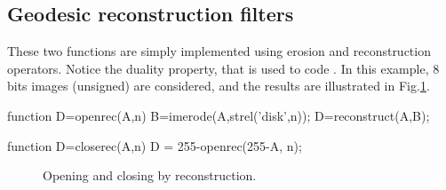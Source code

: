 \subsection{Geodesic reconstruction filters}
These two functions are simply implemented using erosion and reconstruction operators. Notice the duality property, that is used to code . In this example, 8 bits images (unsigned) are considered, and the results are illustrated in Fig.\ref{fig:geodesic_filtering:matlab:georec}.

\begin{matlab}
function D=openrec(A,n)
B=imerode(A,strel('disk',n));
D=reconstruct(A,B);
\end{matlab}

\begin{matlab}
function D=closerec(A,n)
D = 255-openrec(255-A, n); 
\end{matlab}

\begin{figure}[htbp]
 \centering
 \hfill
 \hfill
 \caption{Opening and closing by reconstruction.}
 \label{fig:geodesic_filtering:matlab:georec}
\end{figure}

